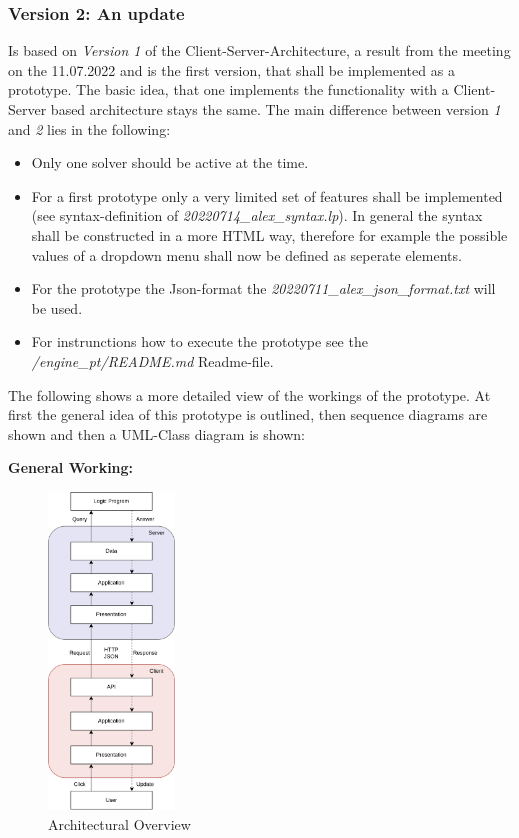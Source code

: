 \documentclass[12pt,a4paper]{article}
\newcommand{\<}[1]{\guilsinglleft}
\renewcommand{\>}[1]{\guilsinglright}
\begin{document}
\newpage
\subsubsection{Version 2: An update}
\noindent Is based on \textit{Version 1} of the Client-Server-Architecture, a result from the meeting on the 11.07.2022 and is the first version, that shall be implemented as a prototype. The basic idea, that one implements the functionality with a Client-Server based architecture stays the same. The main difference between version \textit{1} and \textit{2} lies in the following:

\begin{itemize}
    \item Only one solver should be active at the time.
    \item For a first prototype only a very limited set of features shall be implemented (see syntax-definition of \textit{20220714\_alex\_syntax.lp}). In general the syntax shall be constructed in a more HTML way, therefore for example the possible values of a dropdown menu shall now be defined as seperate elements.
    \item For the prototype the Json-format the \textit{20220711\_alex\_json\_format.txt} will be used.
    \item For instrunctions how to execute the prototype see the \textit{/engine\_pt/README.md} Readme-file.
\end{itemize}

\noindent The following shows a more detailed view of the workings of the prototype. At first the general idea of this prototype is outlined, then sequence diagrams are shown and then a UML-Class diagram is shown:

\noindent \textbf{General Working:} 

\begin{figure}[ht]
    \begin{center}
    \includegraphics[width=0.3\textwidth]{imgs/pt-v2-server-client.png}
    \caption{Architectural Overview}
    \label{fig:pt-v2-server-client}
    \end{center}
\end{figure}
\end{document}
